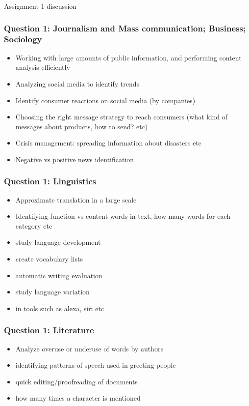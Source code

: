 \documentclass{beamer}
\begin{document}
\begin{frame}
\Large Assignment 1 discussion
\end{frame}

\begin{frame}
\frametitle{Question 1: Journalism and Mass communication; Business; Sociology}
\begin{itemize}
\item Working with large amounts of public information, and performing content analysis efficiently
\item Analyzing social media to identify trends 
\item Identify consumer reactions on social media (by companies)
\item Choosing the right message strategy to reach consumers (what kind of messages about products, how to send? etc)
\item Crisis management: spreading information about disasters etc 
\item Negative vs positive news identification
\end{itemize}
\end{frame}

\begin{frame}
\frametitle{Question 1:  Linguistics}
\begin{itemize}
\item Approximate translation in a large scale
\item Identifying function vs content words in text, how many words for each category etc 
\item study language development 
\item create vocabulary lists
\item automatic writing evaluation
\item study language variation
\item in tools such as alexa, siri etc
\end{itemize}
\end{frame}

\begin{frame}
\frametitle{Question 1: Literature}
\begin{itemize}
\item Analyze overuse or underuse of words by authors
\item identifying patterns of speech used in greeting people
\item quick editing/proofreading of documents
\item how many times a character is mentioned
\end{itemize}
\end{frame}
\end{document}

